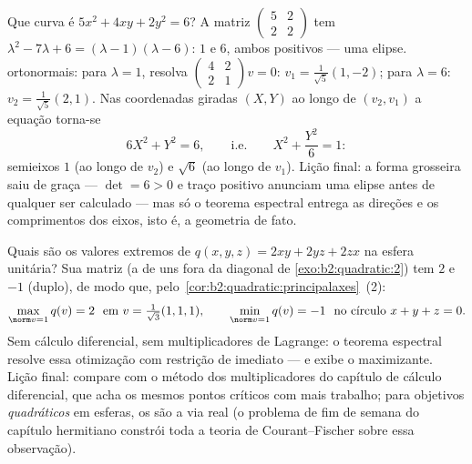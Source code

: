 \begin{example}\label{ex:b2:quadratic:ellipserun}
Que curva é $5x^2 + 4xy + 2y^2 = 6$? A matriz
$\begin{pmatrix} 5 & 2\\ 2 & 2\end{pmatrix}$ tem  $\lambda^2 - 7\lambda + 6 = (\lambda - 1)(\lambda -
6)$:  $1$ e $6$, ambos positivos --- uma elipse.
 ortonormais: para $\lambda = 1$, resolva
$\begin{pmatrix} 4 & 2\\ 2 & 1\end{pmatrix}v = 0$: $v_1 =
\frac{1}{\sqrt5}(1, -2)$; para $\lambda = 6$: $v_2 =
\frac{1}{\sqrt5}(2, 1)$. Nas coordenadas giradas $(X, Y)$
ao longo de $(v_2, v_1)$ a equação torna-se
\[
6X^2 + Y^2 = 6,
\qquad\text{i.e.}\qquad
X^2 + \frac{Y^2}{6} = 1 :
\]
semieixos $1$ (ao longo de $v_2$) e $\sqrt6$ (ao longo de $v_1$).
Lição final: a forma grosseira saiu de graça --- $\det
= 6 > 0$ e traço positivo anunciam uma elipse antes de qualquer
 ser calculado --- mas só o teorema espectral
entrega as direções e os comprimentos dos eixos, isto é, a
geometria de fato.
\end{example}

\begin{example}\label{ex:b2:quadratic:sphereextremes}
Quais são os valores extremos de $q(x,y,z) = 2xy + 2yz + 2zx$ na
esfera unitária? Sua matriz (a de uns fora da diagonal de
\cref{exo:b2:quadratic:2}) tem  $2$ e $-1$
(duplo), de modo que, pelo~\cref{cor:b2:quadratic:principalaxes}~(2):
\[
\max_{\norm v = 1} q(v) = 2
\ \text{ em } v = \tfrac{1}{\sqrt3}(1,1,1),
\qquad
\min_{\norm v = 1} q(v) = -1
\ \text{ no círculo } x + y + z = 0 .
\]
Sem cálculo diferencial, sem multiplicadores de Lagrange: o teorema espectral
resolve essa otimização com restrição de imediato --- e exibe
o maximizante. Lição final: compare com o método dos multiplicadores
do capítulo de cálculo diferencial, que acha os
mesmos pontos críticos com mais trabalho; para objetivos
\emph{quadráticos} em esferas, os  são a via real (o problema de fim
de semana do capítulo hermitiano constrói toda a
teoria de Courant--Fischer sobre essa observação).
\end{example}

